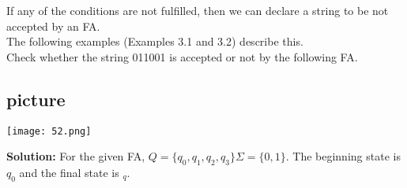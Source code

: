 \documentclass[8pt]{beamer}
\begin{document}
\begin{frame}
\hspace*{0.5cm} If any of the conditions are not fulfilled, then we can declare a string to be not accepted by an FA.\\
\hspace*{0.5cm} The following examples (Examples 3.1 and 3.2) describe this.\\

\hspace*{0.1cm} Check whether the string 011001 is accepted or not by the following FA.\\
\vspace*{0.1cm}

\begin{center}
\section{picture}
\texttt{[image: 52.png]}
\end{center}

\vspace*{0.1cm}

\textbf{Solution:} For the given FA, $Q = \{q_{0}, q_{1}, q_{2}, q_{3}\} \Sigma = \{0, 1\}$. The beginning state is $q_{0}$ and the final state
is $_{q}$.\\
\end{frame}
\end{document}
